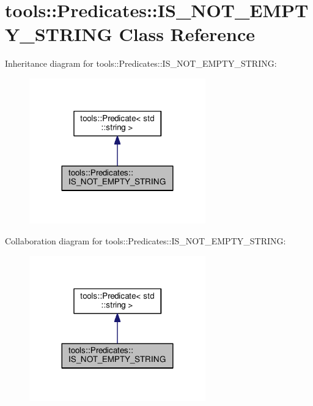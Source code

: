 \hypertarget{classtools_1_1Predicates_1_1IS__NOT__EMPTY__STRING}{}\section{tools\+:\+:Predicates\+:\+:I\+S\+\_\+\+N\+O\+T\+\_\+\+E\+M\+P\+T\+Y\+\_\+\+S\+T\+R\+I\+NG Class Reference}
\label{classtools_1_1Predicates_1_1IS__NOT__EMPTY__STRING}


Inheritance diagram for tools\+:\+:Predicates\+:\+:I\+S\+\_\+\+N\+O\+T\+\_\+\+E\+M\+P\+T\+Y\+\_\+\+S\+T\+R\+I\+NG\+:
\nopagebreak
\begin{figure}[H]
\begin{center}
\leavevmode
\includegraphics[width=216pt]{classtools_1_1Predicates_1_1IS__NOT__EMPTY__STRING__inherit__graph}
\end{center}
\end{figure}


Collaboration diagram for tools\+:\+:Predicates\+:\+:I\+S\+\_\+\+N\+O\+T\+\_\+\+E\+M\+P\+T\+Y\+\_\+\+S\+T\+R\+I\+NG\+:
\nopagebreak
\begin{figure}[H]
\begin{center}
\leavevmode
\includegraphics[width=216pt]{classtools_1_1Predicates_1_1IS__NOT__EMPTY__STRING__coll__graph}
\end{center}
\end{figure}
